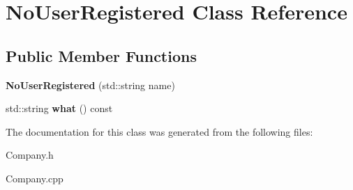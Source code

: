 \hypertarget{class_no_user_registered}{}\section{No\+User\+Registered Class Reference}
\label{class_no_user_registered}
\subsection*{Public Member Functions}
\begin{DoxyCompactItemize}
\item 
\mbox{\label{class_no_user_registered_a928e78029870899c7dceeb95be5ed1d9}} 
{\bfseries No\+User\+Registered} (std\+::string name)
\item 
\mbox{\label{class_no_user_registered_a07aae9e65baf017e03fbe3445ff5ec37}} 
std\+::string {\bfseries what} () const
\end{DoxyCompactItemize}


The documentation for this class was generated from the following files\+:\begin{DoxyCompactItemize}
\item 
Company.\+h\item 
Company.\+cpp\end{DoxyCompactItemize}
